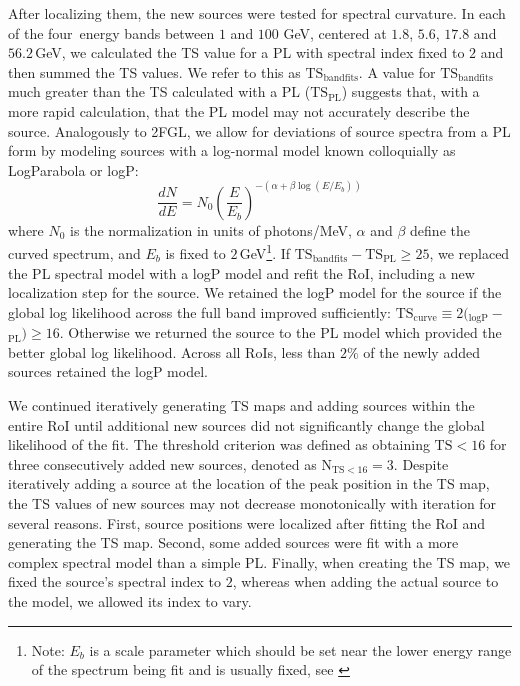{After localizing them, the new sources were tested for spectral curvature. In each of the four~energy bands between $1$ and $100$ GeV, centered at $1.8$, $5.6$, $17.8$ and $56.2$\,GeV, we calculated the TS value for a PL with spectral index fixed to $2$ and then summed the TS values. We refer to this as $\mathrm{TS_{band fits}}$. A value for $\mathrm{TS_{band fits}}$ much greater than the TS calculated with a PL ($\mathrm{TS_{PL}}$) suggests that, with a more rapid calculation, that the PL model may not accurately describe the source. Analogously to 2FGL, we allow for deviations of source spectra from a PL form by modeling sources with a log-normal model known colloquially as LogParabola or logP:
\begin{equation}
\newcommand{\pfrac}[2]{\left(\frac{#1}{#2}\right)} \frac{dN}{dE} = N_0\pfrac{E}{E_b}^{-(\alpha + \beta\log(E/E_b))}
\label{eqn:logP}
\end{equation}
where $N_0$ is the normalization in units of photons/MeV, $\alpha$ and $\beta$ define the curved spectrum, and $E_b$ is fixed to $2$\,GeV\footnote{Note: $E_b$ is a scale parameter which should be set near the lower energy range of the spectrum being fit and is usually fixed, see \citet{massaro04}}. If $\mathrm{TS_{band fits} - TS_{PL}} \geq 25$, we replaced the PL spectral model with a logP model and refit the RoI, including a new localization step for the source. We retained the logP model for the source if the global log likelihood across the full band improved sufficiently: 
$\mathrm{TS_{curve}} \equiv 2 ($\logL{}$_{\mathrm{logP}}-$\logL{}$_{\mathrm{PL}}) \geq 16$. 
Otherwise we returned the source to the PL model which provided the better global log likelihood. Across all RoIs, less than $2\%$ of the newly added sources retained the logP model. 

We continued iteratively generating TS maps and adding sources within the entire RoI until additional new sources did not significantly change the global likelihood of the fit. The threshold criterion was defined as obtaining $\mathrm{TS < 16}$ for three consecutively added new sources, denoted as $\mathrm{N_{TS < 16} = 3}$. Despite iteratively adding a source at the location of the peak position in the TS map, the TS values of new sources may not decrease monotonically with iteration for several reasons. First, source positions were localized after fitting the RoI and generating the TS map. Second, some added sources were fit with a more complex spectral model than a simple PL. Finally, when creating the TS map, we fixed the source's spectral index to $2$, whereas when adding the actual source to the model, we allowed its index to vary. 

}

